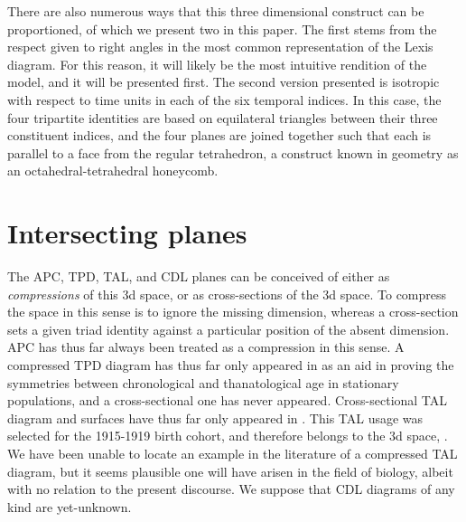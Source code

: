 \documentclass[11pt,oneside,a4paper]{article} %
\begin{document}
There are also
numerous ways that this three dimensional construct can be proportioned, of
which we present two in this paper. The first stems from the respect given to
right angles in the most common representation of the Lexis diagram. For this reason, it will likely be
the most intuitive rendition of the model, and it will be presented first. The
second version presented is isotropic with respect to time units in each of the
six temporal indices. In this case, the four tripartite identities are based on
equilateral triangles between their three constituent indices, and the four
planes are joined together such that each is parallel to a face from the regular
tetrahedron, a construct known in geometry as an octahedral-tetrahedral
honeycomb.

\section*{Intersecting planes}

The APC, TPD, TAL, and CDL planes can be conceived of either as
\textit{compressions} of this 3d space, or as cross-sections of the 3d space. To
compress the space in this sense is to ignore the missing dimension,
whereas a cross-section sets a given triad identity against a particular
position of the absent dimension. APC has thus far always been treated as a
compression in this sense.
A compressed TPD diagram has thus far only appeared in \citet{pancho2015}
as an aid in proving the symmetries between chronological and thanatological age in stationary populations, and a cross-sectional one has
never appeared.
Cross-sectional TAL diagram and surfaces have thus far only appeared in
\citet{riffe2015ttd}. This TAL usage was selected for the 1915-1919 birth
cohort, and therefore belongs to the 3d
space,
.
We have been unable to locate an example in the literature of a compressed
TAL diagram, but it seems plausible one will have arisen in the field of
biology, albeit with no relation to the present discourse. We suppose
that CDL diagrams of any kind are yet-unknown.
\end{document}
